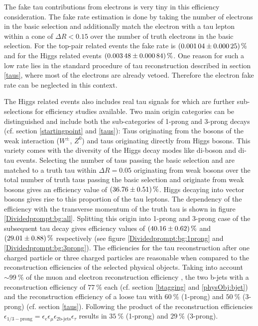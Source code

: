 %
The fake tau contributions from electrons is very tiny in this efficiency consideration. The fake rate estimation is done by taking the number of electrons in the basic selection and additionally match the electron with a tau lepton within a cone of $\Delta R<0.15$ over the number of truth electrons in the basic selection. For the top-pair related events the fake rate is $\SI{0.00104\pm 0.00025}{\percent}$ and for the Higgs related events $\SI{0.00348\pm 0.00084}{\percent}$. One reason for such a low rate lies in the standard procedure of tau reconstruction described in section \ref{taus}, where most of the electrons are already vetoed. Therefore the electron fake rate can be neglected in this context.\par
The Higgs related events also includes real tau signals for which are further sub-selections for efficiency studies available. Two main origin categories can be distinguished and include both the sub-categories of 1-prong and 3-prong decays (cf. section \ref{startingpoint} and \ref{taus}): Taus originating from the bosons of the weak interaction ($W^\pm$, $Z^0$) and taus originating directly from Higgs bosons. This variety comes with the diversity of the Higgs decay modes like di-boson and di-tau events. Selecting the number of taus passing the basic selection and are matched to a truth tau within $\Delta R=0.05$ originating from weak bosons over the total number of truth taus passing the basic selection and originate from weak bosons gives an efficiency value of $\SI{36.76\pm 0.51}{\percent}$. Higgs decaying into vector bosons gives rise to this proportion of the tau leptons. The dependency of the efficiency with the transverse momentum of the truth tau is shown in figure \ref{Dividedprompt:bg:all}. Splitting this origin into 1-prong and 3-prong case of the subsequent tau decay gives efficiency values of $\SI{40.16\pm 0.62}{\percent}$ and $\SI{29.01\pm 0.88}{\percent}$ respectively (see figure \ref{Dividedprompt:bg:1prong} and \ref{Dividedprompt:bg:3prong}). The efficiencies for the tau reconstruction after one charged particle or three charged particles are reasonable when compared to the reconstruction efficiencies of the selected physical objects. Taking into account $\sim\SI{99}{\percent}$ of the muon and electron reconstruction efficiency \cite{muPerformance}\cite{ePerformance2}, the two b-jets with a reconstruction efficiency of $\SI{77}{\percent}$ each (cf. section \ref{btagging} and \ref{physObj:bjet}) and the reconstruction efficiency of a loose tau with $\SI{60}{\percent}$ (1-prong) and $\SI{50}{\percent}$ (3-prong) (cf. section \ref{taus}). Following the product of the reconstruction efficiencies $\epsilon_{1/3-\text{prong}}=\epsilon_e\epsilon_\mu\epsilon_{2\text{b-jets}}\epsilon_\tau$ results in $\SI{35}{\percent}$ (1-prong) and $\SI{29}{\percent}$ (3-prong).\newline

